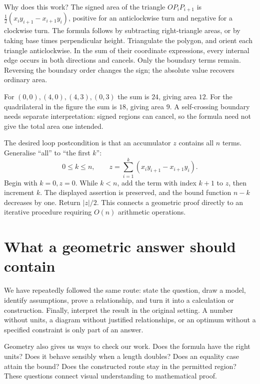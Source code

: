 Why does this work? The signed area of the triangle $OP_iP_{i+1}$ is
$\tfrac12(x_i y_{i+1}-x_{i+1}y_i)$, positive for an anticlockwise turn
and negative for a clockwise turn. The formula follows by subtracting
right-triangle areas, or by taking base times perpendicular height.
Triangulate the polygon, and orient each triangle anticlockwise. In the
sum of their coordinate expressions, every internal edge occurs in both
directions and cancels. Only the boundary terms remain. Reversing the
boundary order changes the sign; the absolute value recovers ordinary area.

For $(0,0),(4,0),(4,3),(0,3)$ the sum is $24$, giving area $12$.
For the quadrilateral in the figure the sum is $18$, giving area $9$.
A self-crossing boundary needs separate interpretation: signed regions
can cancel, so the formula need not give the total area one intended.

The desired loop postcondition is that an accumulator $z$ contains all
$n$ terms. Generalise ``all'' to ``the first $k$'':
\[
0\leq k\leq n,\qquad
z=\sum_{i=1}^{k}(x_i y_{i+1}-x_{i+1}y_i).
\]
Begin with $k=0,z=0$. While $k<n$, add the term with index $k+1$ to $z$,
then increment $k$. The displayed assertion is preserved, and the bound
function $n-k$ decreases by one. Return $|z|/2$. This connects a geometric
proof directly to an iterative procedure requiring $O(n)$ arithmetic operations.

\section{What a geometric answer should contain}
We have repeatedly followed the same route: state the question, draw a
model, identify assumptions, prove a relationship, and turn it into a
calculation or construction. Finally, interpret the result in the original
setting. A number without units, a diagram without justified relationships,
or an optimum without a specified constraint is only part of an answer.

Geometry also gives us ways to check our work. Does the formula have the
right units? Does it behave sensibly when a length doubles? Does an equality
case attain the bound? Does the constructed route stay in the permitted
region? These questions connect visual understanding to mathematical proof.

